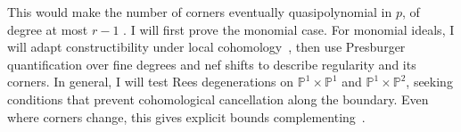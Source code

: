 \documentclass[11pt,reqno]{amsart}
\newtheorem{conjecture}[lemma]{Conjecture}
\theoremstyle{remark}
\newcommand{\reg}{\operatorname{reg}}
\newcommand{\Pic}{\operatorname{Pic}}
\newcommand{\Nef}{\operatorname{Nef}}
\newcommand{\dd}{\mathbf{d}}
\newcommand{\PP}{\mathbb{P}}
\newcommand{\RR}{\mathbb{R}}
\begin{document}
This would make the number of corners eventually quasipolynomial in $p$, of degree at most $r-1$ \cite{woods15}. I will first prove the monomial case. For monomial ideals, I will adapt constructibility under local cohomology~\cite[Thm.~8.1]{DMMOW25}, then use Presburger quantification over fine degrees and nef shifts to describe regularity and its corners. In general, I will test Rees degenerations on $\PP^1\times\PP^1$ and $\PP^1\times\PP^2$, seeking conditions that prevent cohomological cancellation along the boundary. Even where corners change, this gives explicit bounds complementing~\cite{bruceHellerSayrafiSeceleanu25}.

%
%
\end{document}
